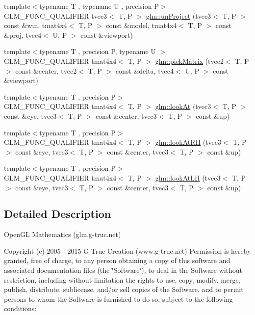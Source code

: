 \begin{DoxyCompactItemize}
\item 
{\footnotesize template$<$typename T , typename U , precision P$>$ }\\G\-L\-M\-\_\-\-F\-U\-N\-C\-\_\-\-Q\-U\-A\-L\-I\-F\-I\-E\-R tvec3$<$ T, P $>$ \hyperlink{group__gtc__matrix__transform_ga82a558de3ce42cbeed0f6ec292a4e1b3}{glm\-::un\-Project} (tvec3$<$ T, P $>$ const \&win, tmat4x4$<$ T, P $>$ const \&model, tmat4x4$<$ T, P $>$ const \&proj, tvec4$<$ U, P $>$ const \&viewport)
\item 
{\footnotesize template$<$typename T , precision P, typename U $>$ }\\G\-L\-M\-\_\-\-F\-U\-N\-C\-\_\-\-Q\-U\-A\-L\-I\-F\-I\-E\-R tmat4x4$<$ T, P $>$ \hyperlink{group__gtc__matrix__transform_ga9026c77505b99990f68826f27c267dc5}{glm\-::pick\-Matrix} (tvec2$<$ T, P $>$ const \&center, tvec2$<$ T, P $>$ const \&delta, tvec4$<$ U, P $>$ const \&viewport)
\item 
{\footnotesize template$<$typename T , precision P$>$ }\\G\-L\-M\-\_\-\-F\-U\-N\-C\-\_\-\-Q\-U\-A\-L\-I\-F\-I\-E\-R tmat4x4$<$ T, P $>$ \hyperlink{group__gtc__matrix__transform_gaf8eef81da1ad09f6a8920101c01eaae4}{glm\-::look\-At} (tvec3$<$ T, P $>$ const \&eye, tvec3$<$ T, P $>$ const \&center, tvec3$<$ T, P $>$ const \&up)
\item 
{\footnotesize template$<$typename T , precision P$>$ }\\G\-L\-M\-\_\-\-F\-U\-N\-C\-\_\-\-Q\-U\-A\-L\-I\-F\-I\-E\-R tmat4x4$<$ T, P $>$ \hyperlink{group__gtc__matrix__transform_ga2876d9313334980b94292d2ec169088e}{glm\-::look\-At\-R\-H} (tvec3$<$ T, P $>$ const \&eye, tvec3$<$ T, P $>$ const \&center, tvec3$<$ T, P $>$ const \&up)
\item 
{\footnotesize template$<$typename T , precision P$>$ }\\G\-L\-M\-\_\-\-F\-U\-N\-C\-\_\-\-Q\-U\-A\-L\-I\-F\-I\-E\-R tmat4x4$<$ T, P $>$ \hyperlink{group__gtc__matrix__transform_gacd0c077ec7b58a575855e29cb5fb586d}{glm\-::look\-At\-L\-H} (tvec3$<$ T, P $>$ const \&eye, tvec3$<$ T, P $>$ const \&center, tvec3$<$ T, P $>$ const \&up)
\end{DoxyCompactItemize}


\subsection{Detailed Description}
Open\-G\-L Mathematics (glm.\-g-\/truc.\-net)

Copyright (c) 2005 -\/ 2015 G-\/\-Truc Creation (www.\-g-\/truc.\-net) Permission is hereby granted, free of charge, to any person obtaining a copy of this software and associated documentation files (the \char`\"{}\-Software\char`\"{}), to deal in the Software without restriction, including without limitation the rights to use, copy, modify, merge, publish, distribute, sublicense, and/or sell copies of the Software, and to permit persons to whom the Software is furnished to do so, subject to the following conditions\-:

